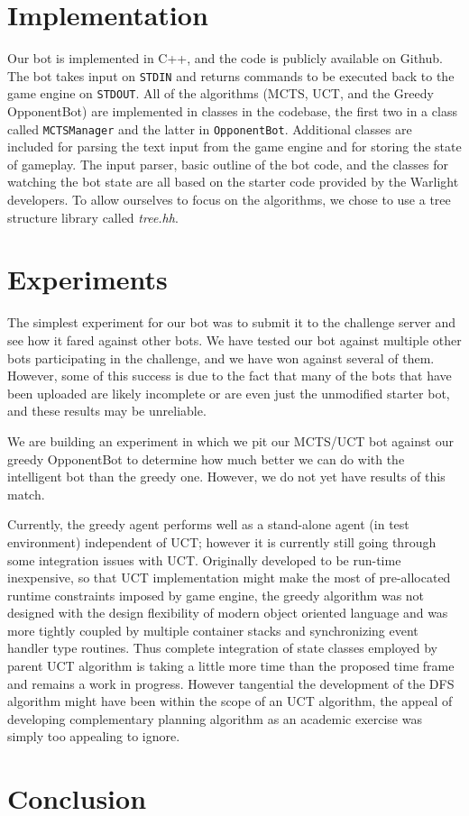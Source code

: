 \documentclass[a4paper,11pt]{article}
\newcommand{\code}[1]{\texttt{#1}}
\begin{document}
\section{Implementation}\label{sec:impl}
Our bot is implemented in C++, and the code is publicly available on Github\cite{github}.  
The bot takes input on \code{STDIN} and returns commands to be executed back to the game 
engine on \code{STDOUT}.  All of the algorithms (MCTS, UCT, and the Greedy OpponentBot) are 
implemented in classes in the codebase, the first two in a class called \code{MCTSManager} 
and the latter in \code{OpponentBot}.  Additional classes are included for parsing the text 
input from the game engine and for storing the state of gameplay.  The input parser, basic 
outline of the bot code, and the classes for watching the bot state are all based on the 
starter code provided by the Warlight developers.  To allow ourselves to focus on the 
algorithms, we chose to use a tree structure library called \emph{tree.hh}\cite{treehh}.

\section{Experiments}\label{sec:experiments}
The simplest experiment for our bot was to submit it to the challenge server and see how it 
fared against other bots.  We have tested our bot against multiple other bots participating 
in the challenge, and we have won against several of them.  However, some of this success is 
due to the fact that many of the bots that have been uploaded are likely incomplete or are 
even just the unmodified starter bot, and these results may be unreliable.

We are building an experiment in which we pit our MCTS/UCT bot against our greedy 
OpponentBot to determine how much better we can do with the intelligent bot than the greedy 
one.  However, we do not yet have results of this match.

Currently, the greedy agent performs well as a stand-alone agent (in test environment) 
independent of UCT; however it is currently still going through some integration issues with 
UCT. Originally developed to be run-time inexpensive, so that UCT implementation might make 
the most of pre-allocated runtime constraints imposed by game engine, the greedy algorithm 
was not designed with the design flexibility of modern object oriented language and was more 
tightly coupled by multiple container stacks and synchronizing event handler type routines. 
Thus complete integration of state classes employed by parent UCT algorithm is taking a 
little more time than the proposed time frame and remains a work in progress. However 
tangential the development of the DFS algorithm might have been within the scope of an UCT 
algorithm, the appeal of developing complementary planning algorithm as an academic exercise 
was simply too appealing to ignore.

\section{Conclusion}\label{sec:conclusion}



\end{document}
